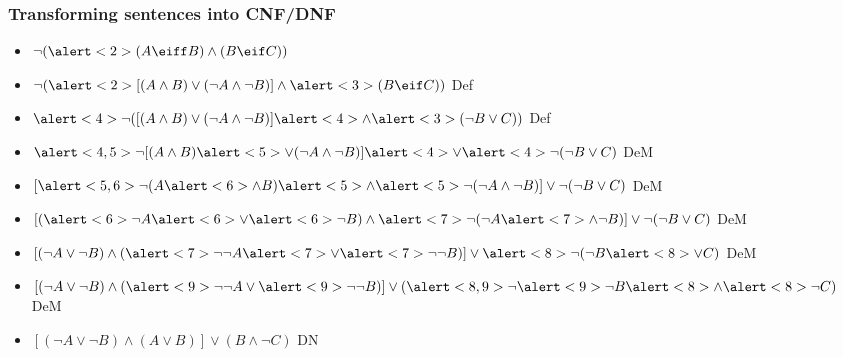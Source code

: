 \begin{frame}
\frametitle{Transforming sentences into CNF/DNF}
\setlength{\leftmargini}{0cm}
\begin{itemize}[<+->]
  \item[] $\lnot(\alert<2>{(A \eiff B)} \land (B \eif C))$
  \item[] $\lnot(\alert<2>{[(A \land B) \lor (\lnot A \land \lnot B)]} \land \alert<3>{(B \eif C)})$
  \hfill\alert<2>{Def\eiff}
  \item[] $\alert<4>{\lnot}([(A \land B) \lor (\lnot A \land \lnot B)] \alert<4>{\land}
  \alert<3>{(\lnot B \lor C)})$
  \hfill\alert<3>{Def\eif}
  \item[] $\alert<4,5>{\lnot}[(A \land B) \alert<5>{\lor} (\lnot A \land \lnot B)] \alert<4>{\lor}
  \alert<4>{\lnot}(\lnot B \lor C)$
  \hfill\alert<4>{DeM}
\item[] $[\alert<5,6>{\lnot}(A \alert<6>{\land} B) \alert<5>{\land} \alert<5>{\lnot}(\lnot A \land \lnot B)] \lor
  \lnot(\lnot B \lor C)$   \hfill\alert<5>{DeM}
\item[] $[(\alert<6>{\lnot}A \alert<6>{\lor} \alert<6>{\lnot}B) \land \alert<7>{\lnot}(\lnot A \alert<7>{\land} \lnot B)] \lor
  \lnot(\lnot B \lor C)$   \hfill\alert<6>{DeM}
\item[] $[(\lnot A \lor \lnot B) \land (\alert<7>{\lnot}\lnot A \alert<7>{\lor} \alert<7>{\lnot}\lnot B)] \lor
  \alert<8>{\lnot}(\lnot B \alert<8>{\lor} C)$
  \hfill\alert<7>{DeM}
\item[] $[(\lnot A \lor \lnot B) \land (\alert<9>{\lnot\lnot} A \lor \alert<9>{\lnot\lnot} B)] \lor
  (\alert<8,9>{\lnot}\alert<9>{\lnot} B \alert<8>{\land} \alert<8>{\lnot}C)$ \hfill\alert<8>{DeM}
\item[] $[(\lnot A \lor \lnot B) \land (A \lor B)] \lor
  (B \land \lnot C)$ \hfill\alert<8>{DN}
\end{itemize}
\end{frame}

